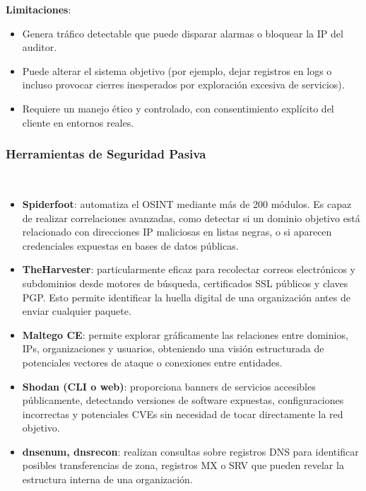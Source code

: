 \documentclass[runningheads]{llncs}
\begin{document}
\textbf{Limitaciones}:

\begin{itemize}
\item Genera tráfico detectable que puede disparar alarmas o bloquear la IP del auditor.

\item Puede alterar el sistema objetivo (por ejemplo, dejar registros en logs o incluso provocar cierres inesperados por exploración excesiva de servicios).

\item Requiere un manejo ético y controlado, con consentimiento explícito del cliente en entornos reales.
\end{itemize}

\subsubsection{Herramientas de Seguridad Pasiva}
\hfill\\

\begin{itemize}

\item \textbf{Spiderfoot}: automatiza el OSINT mediante más de 200 módulos. Es capaz de realizar correlaciones avanzadas, como detectar si un dominio objetivo está relacionado con direcciones IP maliciosas en listas negras, o si aparecen credenciales expuestas en bases de datos públicas.

\item \textbf{TheHarvester}: particularmente eficaz para recolectar correos electrónicos y subdominios desde motores de búsqueda, certificados SSL públicos y claves PGP. Esto permite identificar la huella digital de una organización antes de enviar cualquier paquete.

\item \textbf{Maltego CE}: permite explorar gráficamente las relaciones entre dominios, IPs, organizaciones y usuarios, obteniendo una visión estructurada de potenciales vectores de ataque o conexiones entre entidades.

\item \textbf{Shodan (CLI o web)}: proporciona banners de servicios accesibles públicamente, detectando versiones de software expuestas, configuraciones incorrectas y potenciales CVEs sin necesidad de tocar directamente la red objetivo.

\item \textbf{dnsenum, dnsrecon}: realizan consultas sobre registros DNS para identificar posibles transferencias de zona, registros MX o SRV que pueden revelar la estructura interna de una organización.
\end{itemize}
\end{document}
